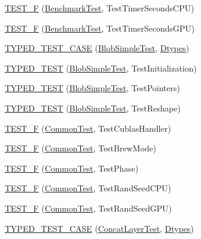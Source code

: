 \begin{DoxyCompactItemize}
\hyperlink{namespacecaffe_a17bb1397dc4cb269875036bcf0147969}{T\+E\+S\+T\+\_\+\+F} (\hyperlink{classcaffe_1_1_benchmark_test}{Benchmark\+Test}, Test\+Timer\+Seconds\+C\+P\+U)
\item 
\hyperlink{namespacecaffe_a10d7757e76101e0841f605c58b8a0600}{T\+E\+S\+T\+\_\+\+F} (\hyperlink{classcaffe_1_1_benchmark_test}{Benchmark\+Test}, Test\+Timer\+Seconds\+G\+P\+U)
\item 
\hyperlink{namespacecaffe_a5f3dfe02228d38afc71f2dc43cc55e8d}{T\+Y\+P\+E\+D\+\_\+\+T\+E\+S\+T\+\_\+\+C\+A\+S\+E} (\hyperlink{classcaffe_1_1_blob_simple_test}{Blob\+Simple\+Test}, \hyperlink{namespacecaffe_a131dc2be50f2f10e18450da61cde6b57}{Dtypes})
\item 
\hyperlink{namespacecaffe_aead26735c513a046a8e5e660e8a88a9a}{T\+Y\+P\+E\+D\+\_\+\+T\+E\+S\+T} (\hyperlink{classcaffe_1_1_blob_simple_test}{Blob\+Simple\+Test}, Test\+Initialization)
\item 
\hyperlink{namespacecaffe_afe9032ead419fe3f9c2fe2b67fac1df4}{T\+Y\+P\+E\+D\+\_\+\+T\+E\+S\+T} (\hyperlink{classcaffe_1_1_blob_simple_test}{Blob\+Simple\+Test}, Test\+Pointers)
\item 
\hyperlink{namespacecaffe_afe240e657b2085b5f7538ea7abfd14fc}{T\+Y\+P\+E\+D\+\_\+\+T\+E\+S\+T} (\hyperlink{classcaffe_1_1_blob_simple_test}{Blob\+Simple\+Test}, Test\+Reshape)
\item 
\hyperlink{namespacecaffe_a818246b5d18a5ac2eaf36fd8deecbc18}{T\+E\+S\+T\+\_\+\+F} (\hyperlink{classcaffe_1_1_common_test}{Common\+Test}, Test\+Cublas\+Handler)
\item 
\hyperlink{namespacecaffe_af7a4f8fb3a88bc12550178c783874701}{T\+E\+S\+T\+\_\+\+F} (\hyperlink{classcaffe_1_1_common_test}{Common\+Test}, Test\+Brew\+Mode)
\item 
\hyperlink{namespacecaffe_ac980b26ecd44227a79b0ed0f3d5aba48}{T\+E\+S\+T\+\_\+\+F} (\hyperlink{classcaffe_1_1_common_test}{Common\+Test}, Test\+Phase)
\item 
\hyperlink{namespacecaffe_ae04efdd52b1376d580f0cb35c7270151}{T\+E\+S\+T\+\_\+\+F} (\hyperlink{classcaffe_1_1_common_test}{Common\+Test}, Test\+Rand\+Seed\+C\+P\+U)
\item 
\hyperlink{namespacecaffe_a4709d11684bed07a61986ac811aad9cf}{T\+E\+S\+T\+\_\+\+F} (\hyperlink{classcaffe_1_1_common_test}{Common\+Test}, Test\+Rand\+Seed\+G\+P\+U)
\item 
\hyperlink{namespacecaffe_ac510e62d95e6519aad0ab6bc347336dd}{T\+Y\+P\+E\+D\+\_\+\+T\+E\+S\+T\+\_\+\+C\+A\+S\+E} (\hyperlink{classcaffe_1_1_concat_layer_test}{Concat\+Layer\+Test}, \hyperlink{namespacecaffe_a131dc2be50f2f10e18450da61cde6b57}{Dtypes})

\end{DoxyCompactItemize}
